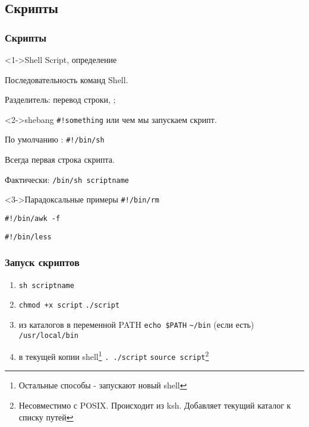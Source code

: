 \subsection{Скрипты}

\begin{frame}[fragile]
  \frametitle{Скрипты}
 
  \begin{block}<1->{Shell Script, определение}  

    Последовательность команд Shell.

    Разделитель: перевод строки, \textquotedbl ; \textquotedbl
  \end{block}

  \begin{block}<2->{shebang}
    \verb+#!something+ или чем мы запускаем скрипт. 
    
    По умолчанию : \verb+#!/bin/sh+
  
    Всегда первая строка скрипта.

    Фактически: \verb+/bin/sh scriptname+
  \end{block}

  \begin{block}<3->{Парадоксальные примеры}
    \verb+#!/bin/rm+

    \verb+#!/bin/awk -f+

    \verb+#!/bin/less+
  \end{block}

\end{frame}

\begin{frame}[fragile]
  \frametitle{Запуск скриптов}
  \begin{enumerate} 
    \item \verb+sh scriptname+
    \item \verb-chmod +x script- \newline \verb+./script+
    \item из каталогов в переменной PATH 
      \newline \verb+echo $PATH+
      \newline \verb+~/bin+ (если есть)
      \newline \verb+/usr/local/bin+
    \item в текущей копии shell\footnote{ Остальные способы - запускают новый shell}
      \newline \verb+. ./script+
      \newline \verb+source script+\footnote{ Несовместимо с POSIX. Происходит из ksh. Добавляет текущий каталог к списку путей}
  \end{enumerate}
\end{frame}

